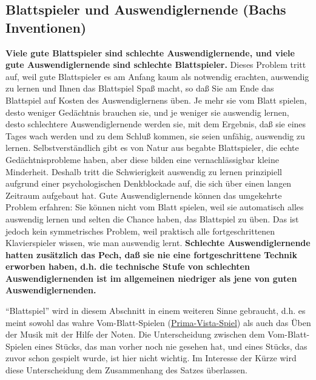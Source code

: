 
\subsection{Blattspieler und Auswendiglernende (Bachs Inventionen)}\hypertarget{c1iii6l}{}

\textbf{Viele gute Blattspieler sind schlechte Auswendiglernende, und viele gute Auswendiglernende sind schlechte Blattspieler.}
Dieses Problem tritt auf, weil gute Blattspieler es am Anfang kaum als notwendig erachten, auswendig zu lernen und Ihnen das Blattspiel Spaß macht, so daß Sie am Ende das Blattspiel auf Kosten des Auswendiglernens üben.
Je mehr sie vom Blatt spielen, desto weniger Gedächtnis brauchen sie, und je weniger sie auswendig lernen, desto schlechtere Auswendiglernende werden sie, mit dem Ergebnis, daß sie eines Tages wach werden und zu dem Schluß kommen, sie seien unfähig, auswendig zu lernen.
Selbstverständlich gibt es von Natur aus begabte Blattspieler, die echte Gedächtnisprobleme haben, aber diese bilden eine vernachlässigbar kleine Minderheit.
Deshalb tritt die Schwierigkeit auswendig zu lernen prinzipiell aufgrund einer psychologischen Denkblockade auf, die sich über einen langen Zeitraum aufgebaut hat.
Gute Auswendiglernende können das umgekehrte Problem erfahren: Sie können nicht vom Blatt spielen, weil sie automatisch alles auswendig lernen und selten die Chance haben, das Blattspiel zu üben.
Das ist jedoch kein symmetrisches Problem, weil praktisch alle fortgeschrittenen Klavierspieler wissen, wie man auswendig lernt.
\textbf{Schlechte Auswendiglernende hatten zusätzlich das Pech, daß sie nie eine fortgeschrittene Technik erworben haben, d.h. die technische Stufe von schlechten Auswendiglernenden ist im allgemeinen niedriger als jene von guten Auswendiglernenden.}

\enquote{Blattspiel} wird in diesem Abschnitt in einem weiteren Sinne gebraucht, d.h. es meint sowohl das wahre Vom-Blatt-Spielen (\hyperlink{c030530}{Prima-Vista-Spiel}) als auch das Üben der Musik mit der Hilfe der Noten.
Die Unterscheidung zwischen dem Vom-Blatt-Spielen eines Stücks, das man vorher noch nie gesehen hat, und eines Stücks, das zuvor schon gespielt wurde, ist hier nicht wichtig.
Im Interesse der Kürze wird diese Unterscheidung dem Zusammenhang des Satzes überlassen.

